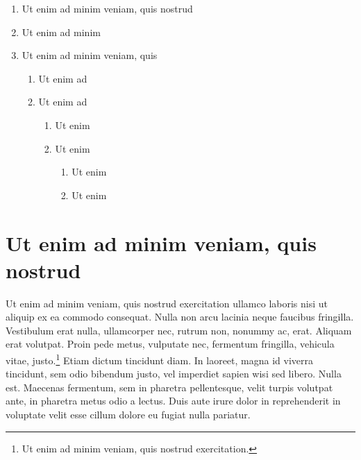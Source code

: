 \lipsum[6-7]

\begin{enumerate}
    \item Ut enim ad minim veniam, quis nostrud
    \item Ut enim ad minim 
    \item Ut enim ad minim veniam, quis 
    \begin{enumerate}
        \item Ut enim ad
        \item Ut enim ad
        \begin{enumerate}
            \item Ut enim 
            \item Ut enim 
            \begin{enumerate}
            \item Ut enim 
            \item Ut enim 
        \end{enumerate}
        \end{enumerate}
    \end{enumerate}
\end{enumerate}


\section{Ut enim ad minim veniam, quis nostrud}

Ut enim ad minim veniam, quis nostrud exercitation ullamco laboris nisi ut aliquip ex ea commodo consequat. Nulla non arcu lacinia neque faucibus fringilla. Vestibulum erat nulla, ullamcorper nec, rutrum non, nonummy ac, erat. Aliquam erat volutpat. Proin pede metus, vulputate nec, fermentum fringilla, vehicula vitae, justo.\footnote{Ut enim ad minim veniam, quis nostrud exercitation.} Etiam dictum tincidunt diam. In laoreet, magna id viverra tincidunt, sem odio bibendum justo, vel imperdiet sapien wisi sed libero. Nulla est. Maecenas fermentum, sem in pharetra pellentesque, velit turpis volutpat ante, in pharetra metus odio a lectus. Duis aute irure dolor in reprehenderit in voluptate velit esse cillum dolore eu fugiat nulla pariatur. 


